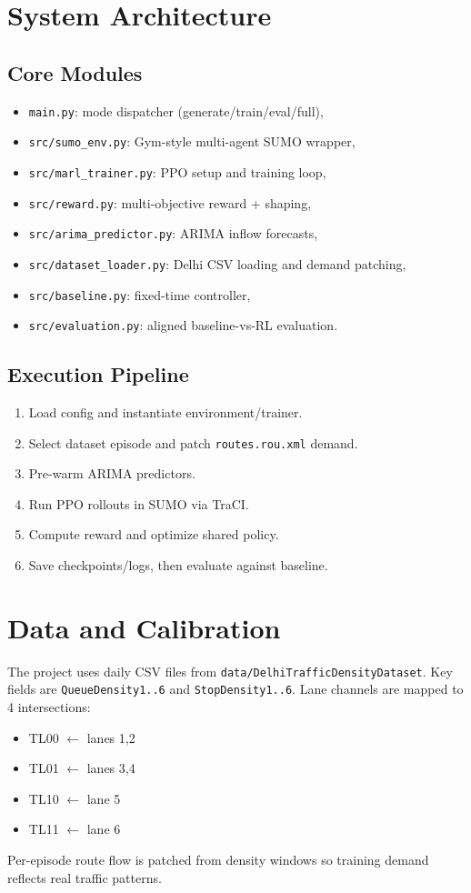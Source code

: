 \documentclass[conference]{IEEEtran}
\begin{document}
\section{System Architecture}
\subsection{Core Modules}
\begin{itemize}
    \item \texttt{main.py}: mode dispatcher (generate/train/eval/full),
    \item \texttt{src/sumo\_env.py}: Gym-style multi-agent SUMO wrapper,
    \item \texttt{src/marl\_trainer.py}: PPO setup and training loop,
    \item \texttt{src/reward.py}: multi-objective reward + shaping,
    \item \texttt{src/arima\_predictor.py}: ARIMA inflow forecasts,
    \item \texttt{src/dataset\_loader.py}: Delhi CSV loading and demand patching,
    \item \texttt{src/baseline.py}: fixed-time controller,
    \item \texttt{src/evaluation.py}: aligned baseline-vs-RL evaluation.
\end{itemize}

\subsection{Execution Pipeline}
\begin{enumerate}
    \item Load config and instantiate environment/trainer.
    \item Select dataset episode and patch \texttt{routes.rou.xml} demand.
    \item Pre-warm ARIMA predictors.
    \item Run PPO rollouts in SUMO via TraCI.
    \item Compute reward and optimize shared policy.
    \item Save checkpoints/logs, then evaluate against baseline.
\end{enumerate}

\section{Data and Calibration}
The project uses daily CSV files from \texttt{data/DelhiTrafficDensityDataset}. Key fields are \texttt{QueueDensity1..6} and \texttt{StopDensity1..6}. Lane channels are mapped to 4 intersections:
\begin{itemize}
    \item TL00 $\leftarrow$ lanes 1,2
    \item TL01 $\leftarrow$ lanes 3,4
    \item TL10 $\leftarrow$ lane 5
    \item TL11 $\leftarrow$ lane 6
\end{itemize}
Per-episode route flow is patched from density windows so training demand reflects real traffic patterns.
\end{document}
